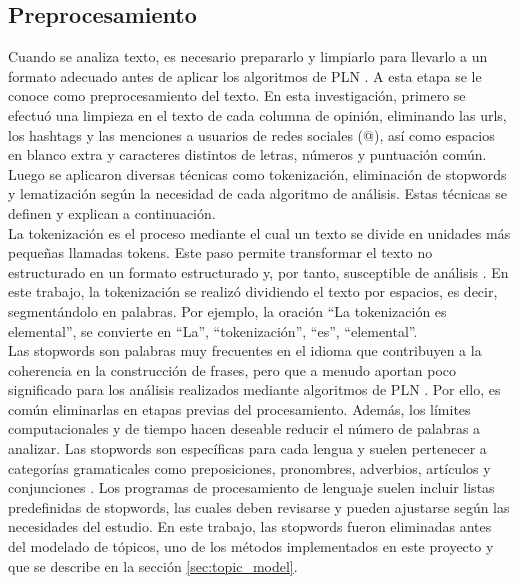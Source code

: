 \documentclass[11pt,a4paper]{article}
\begin{document}
	\subsection{Preprocesamiento}
	
	Cuando se analiza texto, es necesario prepararlo y limpiarlo para llevarlo a un formato adecuado antes de aplicar los algoritmos de PLN \cite{Chai2022}. A esta etapa se le conoce como preprocesamiento del texto.  En esta investigación, primero se efectuó una limpieza en el texto de cada columna de opinión, eliminando las urls, los hashtags y las menciones a usuarios de redes sociales (@), así como espacios en blanco extra y caracteres distintos de letras, números y puntuación común. Luego se aplicaron diversas técnicas como tokenización, eliminación de stopwords y lematización según la necesidad de cada algoritmo de análisis. Estas técnicas se definen y explican a continuación. \\
	
	La tokenización es el proceso mediante el cual un texto se divide en unidades más pequeñas llamadas tokens. Este paso permite transformar el texto no estructurado en un formato estructurado y, por tanto, susceptible de análisis \cite{Tyagi_text}. En este trabajo, la tokenización se realizó dividiendo el texto por espacios, es decir, segmentándolo en palabras. Por ejemplo, la oración ``La tokenización es elemental'', se convierte en ``La'', ``tokenización'', ``es'', ``elemental''.\\
	
	Las stopwords son palabras muy frecuentes en el idioma que contribuyen a la coherencia en la construcción de frases, pero que a menudo aportan poco significado para los análisis realizados mediante algoritmos de PLN \cite{Siino2024}. Por ello, es común eliminarlas en etapas previas del procesamiento. Además, los límites computacionales y de tiempo hacen deseable reducir el número de palabras a analizar. Las stopwords son específicas para cada lengua y suelen pertenecer a categorías gramaticales como preposiciones, pronombres, adverbios, artículos y conjunciones \cite{Siino2024}. Los programas de procesamiento de lenguaje suelen incluir listas predefinidas de stopwords, las cuales deben revisarse y pueden ajustarse según las necesidades del estudio. En este trabajo, las stopwords fueron eliminadas antes del modelado de tópicos, uno de los métodos implementados en este proyecto y que se describe en la sección \ref{sec:topic_model}. \\
	
\end{document}
